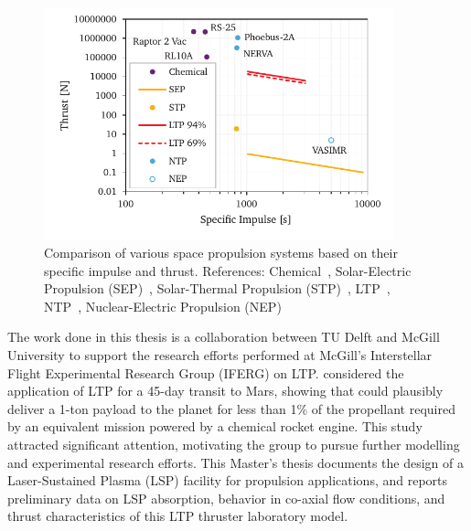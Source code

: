     \begin{figure}[h]
        \centering
        \includegraphics[width=0.9\textwidth]{assets/1 intro/propulsionComparison2}
        \caption[Comparison of various space propulsion systems]{Comparison of various space propulsion systems based on their specific impulse and thrust. References: Chemical~\cite{l3harrisRL10Engine2023,l3harrisRS25Engine2023,belluscioSpaceXAdvancesDrive2014}, Solar-Electric Propulsion (SEP)~\cite{aerojetrocketdyneNEXTCNASAEvolutionary2022}, Solar-Thermal Propulsion (STP)~\cite{woodcockEvaluationSolarThermal2003}, LTP~\cite{duplayDesignRapidTransit2022,shojiPerformanceHeatTransfer1976}, NTP~\cite{koenigExperienceGainedSpace1986}, Nuclear-Electric Propulsion (NEP)~\cite{adastraTechnology2013}}
        \label{fig:propulsion_comparison}
    \end{figure}

    The work done in this thesis is a collaboration between TU Delft and McGill University to support the research efforts performed at McGill's Interstellar Flight Experimental Research Group (IFERG) on LTP. \textcite{duplayDesignRapidTransit2022} considered the application of LTP for a 45-day transit to Mars, showing that  could plausibly deliver a 1-ton payload to the planet for less than 1\% of the propellant required by an equivalent mission powered by a chemical rocket engine. This study attracted significant attention, motivating the group to pursue further modelling and experimental research efforts. This Master's thesis documents the design of a Laser-Sustained Plasma (LSP) facility for propulsion applications, and reports preliminary data on LSP absorption, behavior in co-axial flow conditions, and thrust characteristics of this LTP thruster laboratory model.

